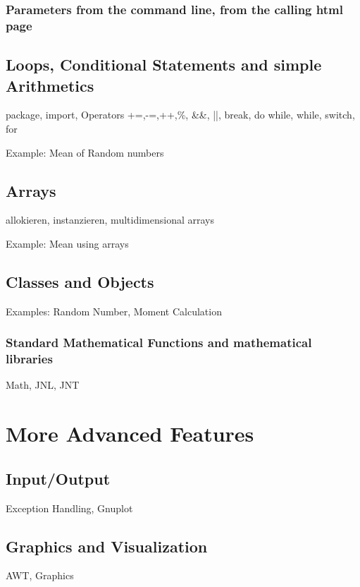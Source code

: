 \subsubsection{Parameters from the command line, from the calling html page}

\subsection{Loops, Conditional Statements and simple Arithmetics}
\label{sec:Loops}
package, import, Operators +=,-=,++,\%, \&\&, ||, break,
do while, while, switch, for

Example: Mean of Random numbers

\subsection{Arrays}
\label{sec:Arrays}
allokieren, instanzieren, multidimensional arrays

Example: Mean using arrays

\subsection{Classes and Objects}
\label{sec:Classes_and_Objects}
Examples: Random Number, Moment Calculation


\subsubsection{Standard Mathematical Functions and mathematical libraries}
\label{sec:Standard_Math}
Math, JNL, JNT  

\section{More Advanced Features}

\subsection{Input/Output}
\label{sec:Input/Output}
Exception Handling, Gnuplot

\subsection{Graphics and Visualization}
\label{sec:Graphics_and_Visualization}
AWT, Graphics

